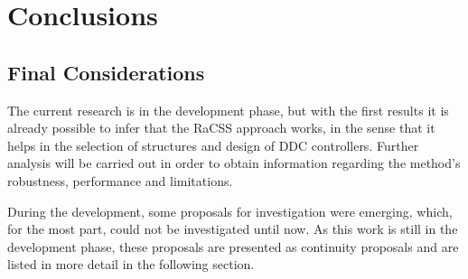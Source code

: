 
\chapter{Conclusions}\label{cap:Concl}
\vspace{-1cm}

%
%


\section{Final Considerations}\label{sec:Cons_finais}

The current research is in the development phase, but with the first results it is already possible to infer that the RaCSS approach works, in the sense that it helps in the selection of structures and design of DDC controllers. Further analysis will be carried out in order to obtain information regarding the method's robustness, performance and limitations.

During the development, some proposals for investigation were emerging, which, for the most part, could not be investigated until now. As this work is still in the development phase, these proposals are presented as continuity proposals and are listed in more detail in the following section.

